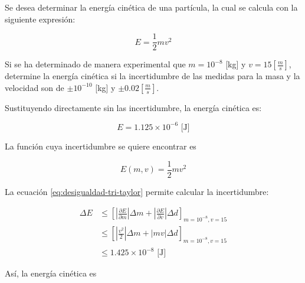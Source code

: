 \begin{ex}
	
	Se desea determinar la energía cinética de una partícula, la cual se
	calcula con la siguiente expresión:

	\begin{equation*}
		E = \frac{1}{2} m v^2
	\end{equation*}

	Si se ha determinado de manera experimental que \(m = 10^{-8}\) [kg] y $v
	= 15 [\frac{m}{s}]$, determine la energía cinética si la incertidumbre
	de las medidas para la masa y la velocidad son de $\pm 10^{-10}$ [kg] y
	$\pm 0.02 [\frac{m}{s}]$.

	\begin{solution}

		Sustituyendo directamente sin las incertidumbre, la energía
		cinética es:

		\begin{equation*}
			E = 1.125 \times 10^{-6} \text{ [J]}
		\end{equation*}

		La función cuya incertidumbre se quiere encontrar es

		\begin{equation*}
			E(m, v) = \frac{1}{2} m v^2
		\end{equation*}

		La ecuación \ref{eq:desigualdad-tri-taylor} permite calcular la
		incertidumbre:

		\begin{align*}
			\Delta E &\leq \left[ \left| \frac{\partial E}{\partial m}
			\right| \Delta m + \left| \frac{\partial E}{\partial v}
		\right| \Delta d \right]_{m = 10^{-8}, v = 15}\\
				 &\leq \left[ \left| \frac{v^2}{2}
			\right| \Delta m + \left| m v \right| \Delta d 
		\right]_{m = 10^{-8}, v = 15} \\
				 &\leq 1.425 \times 10^{-8} \text{ [J]}
		\end{align*}

		Así, la energía cinética es

		\begin{center}
		\end{center}

	\end{solution}
\end{ex}

